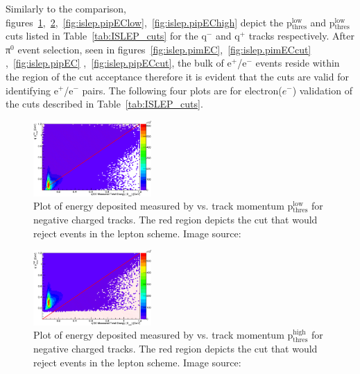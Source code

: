 Similarly to the  comparison, figures~\ref{fig:islep.pimEClow},~\ref{fig:islep.pimEChigh},~\ref{fig:islep.pipEClow},~\ref{fig:islep.pipEChigh} depict the  p$\mathrm{_{thres}^{low}}$ and  p$\mathrm{_{thres}^{low}}$ cuts listed in  Table~\ref{tab:ISLEP_cuts} for the q$^-$ and q$^+$ tracks respectively. After π$^0$ event selection, seen in figures~\ref{fig:islep.pimEC},~\ref{fig:islep.pimECcut} ,~\ref{fig:islep.pipEC} ,~\ref{fig:islep.pipECcut}, the bulk of e$^+$/e$^-$ events reside within the region of the cut acceptance therefore it is evident that the   cuts are valid for identifying e$^+$/e$^-$ pairs. The following four plots are for electron($e^-$)  validation of the   cuts described in Table~\ref{tab:ISLEP_cuts}.
%
\begin{figure}\begin{center}
\includegraphics[width=0.4\textwidth]{figures/lepton/Pim_EClow.eps}
\caption[ Deposited Energy Comparison to Lower Threshold Track Momentum for q$^-$ Tracks]{\label{fig:islep.pimEClow}Plot of energy deposited measured by  vs. track momentum p$\mathrm{_{thres}^{low}}$ for negative charged tracks. The red region depicts the cut that would reject events in the  lepton   scheme. Image source:~\cite{clas.thesis.kunkel}}
\end{center}\end{figure}

\begin{figure}\begin{center}
\includegraphics[width=0.4\textwidth]{figures/lepton/Pim_EChigh.eps}
\caption[ Deposited Energy Comparison to Upper Threshold Track Momentum for q$^-$ Tracks]{\label{fig:islep.pimEChigh}Plot of energy deposited measured by  vs. track momentum p$\mathrm{_{thres}^{high}}$ for negative charged tracks. The red region depicts the cut that would reject events in the  lepton   scheme. Image source:~\cite{clas.thesis.kunkel}}
\end{center}\end{figure}


